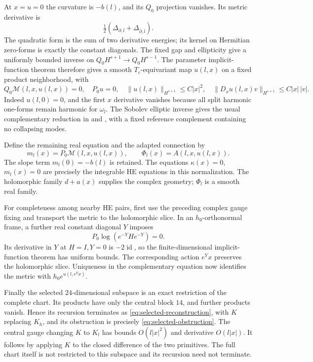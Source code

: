 \documentclass[11pt]{amsart}
\theoremstyle{definition}
\theoremstyle{remark}
\newcommand{\db}{\bar\partial}
\newcommand{\id}{\operatorname{id}}
\begin{document}
At $x=u=0$ the curvature is $-b(l)$, and its $Q_0$ projection
vanishes. Its metric derivative is
\[
 \tfrac12(\Delta_{\partial,l}+\Delta_{\db,l}).
\]
The quadratic form is the sum of two derivative energies; its kernel
on Hermitian zero-forms is exactly the constant diagonals. The fixed
gap and ellipticity give a uniformly bounded inverse on
$Q_0H^{s+1}\to Q_0H^{s-1}$. The parameter implicit-function theorem
therefore gives a smooth $T_c$-equivariant map $u(l,x)$ on a fixed
product neighborhood, with
\begin{equation}\label{eq:wall-metric-complement}
 Q_0\mathcal M(l,x,u(l,x))=0,\quad P_0u=0,\quad
 \|u(l,x)\|_{H^{s+1}}\le C|x|^2,\quad
 \|D_xu(l,x)v\|_{H^{s+1}}\le C|x|\,|v|.
\end{equation}
Indeed $u(l,0)=0$, and the first $x$ derivative vanishes because
all split harmonic one-forms remain harmonic for $\omega_l$.
The Sobolev elliptic inverse gives the usual complementary reduction in
\cite[Section~3]{ClarkeTipler24} and
\cite[Lemma~4.1 and Proposition~4.2]{Delloque25}, with a fixed
reference complement containing no collapsing modes.

Define the remaining real equation and the adapted connection by
\begin{equation}\label{eq:wall-moment}
 m_l(x)=P_0\mathcal M(l,x,u(l,x)),\qquad
 \Phi_l(x)=A(l,x,u(l,x)).
\end{equation}
The slope term $m_l(0)=-b(l)$ is retained. The equations
$\kappa(x)=0$, $m_l(x)=0$ are precisely the integrable HE equations
in this normalization. The holomorphic family $d+a(x)$ supplies
the complex geometry; $\Phi_l$ is a smooth real family.

For completeness among nearby HE pairs, first use the preceding
complex gauge fixing and transport the metric to the holomorphic
slice. In an $h_0$-orthonormal frame, a further real constant diagonal
$Y$ imposes
\begin{equation}\label{eq:metric-normalization}
 P_0\log(e^{-Y}He^{-Y})=0.
\end{equation}
Its derivative in $Y$ at $H=I,Y=0$ is $-2\id$, so the
finite-dimensional implicit-function theorem has uniform bounds.
The corresponding action $e^Yx$ preserves the holomorphic slice.
Uniqueness in the complementary equation now identifies the metric
with $h_0e^{u(l,e^Yx)}$.

Finally the selected $24$-dimensional subspace is an exact restriction
of the complete chart. Its products have only the central block $14$,
and further products vanish. Hence its recursion terminates as
\eqref{eq:selected-reconstruction}, with $K$ replacing $K_h$, and
its obstruction is precisely \eqref{eq:selected-obstruction}.
The central gauge changing $K$ to $K_l$ has bounds
$O(l|x|^2)$ and derivative $O(l|x|)$. It follows by applying $K$
to the closed difference of the two primitives. The full chart itself
is not restricted to this subspace and its recursion need not terminate.
\end{document}

